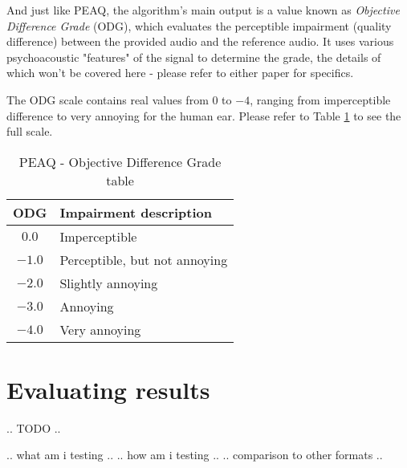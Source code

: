 And just like PEAQ, the algorithm's main output is a value known as \emph{Objective Difference Grade} (ODG), which evaluates the perceptible impairment (quality difference) between the provided audio and the reference audio. It uses various psychoacoustic "features" of the signal to determine the grade, the details of which won't be covered here - please refer to either paper for specifics.

The ODG scale contains real values from $0$ to $-4$, ranging from imperceptible difference to very annoying for the human ear. Please refer to Table \ref{tab:odg_scale} to see the full scale.

\begin{table}[htbp]\caption{PEAQ - Objective Difference Grade table}
	\label{tab:odg_scale}
	\centering
	\begin{tabular}{|c|l|}
		\hline
		ODG & Impairment description \\ \hline
		$0.0$ & Imperceptible \\
		$-1.0$ & Perceptible, but not annoying \\
		$-2.0$ & Slightly annoying \\
		$-3.0$ & Annoying \\
		$-4.0$ & Very annoying \\
		\hline
	\end{tabular}
\end{table}

\section{Evaluating results}
.. TODO ..

.. what am i testing ..
.. how am i testing ..
.. comparison to other formats ..
